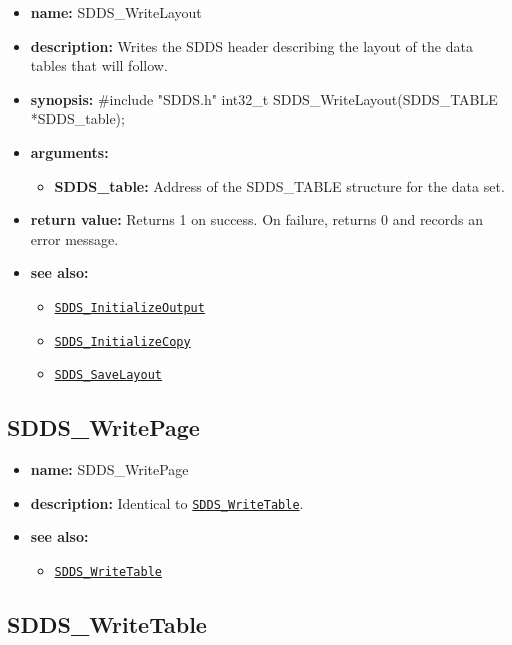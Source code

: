 \documentclass[11pt]{article}
\newcommand{\progref}[1]{\hyperref[SDDS_#1]{\tt SDDS\_#1}}
\begin{document}
\begin{itemize}
\item {\bf name:}\newline
SDDS\_WriteLayout
\item {\bf description:}\newline
Writes the SDDS header describing the layout of the data tables that will follow.
\item {\bf synopsis:} \#include "SDDS.h"\newline
int32\_t SDDS\_WriteLayout(SDDS\_TABLE *SDDS\_table);
\item {\bf arguments:}
\begin{itemize}
\item {\bf SDDS\_table:} Address of the SDDS\_TABLE structure for the data set.
\end{itemize}
\item {\bf return value:}\newline
Returns 1 on success. On failure, returns 0 and records an error message.
\item {\bf see also:}
\begin{itemize}
\item \progref{InitializeOutput}
\item \progref{InitializeCopy}
\item \progref{SaveLayout}
\end{itemize}
\end{itemize}

\subsection{SDDS\_WritePage}
\label{SDDS_WritePage}

\begin{itemize}
\item {\bf name:}\newline
SDDS\_WritePage
\item {\bf description:}\newline
Identical to \progref{WriteTable}.
\item {\bf see also:}
\begin{itemize}
\item \progref{WriteTable}
\end{itemize}
\end{itemize}

\subsection{SDDS\_WriteTable}
\label{SDDS_WriteTable}
\end{document}
